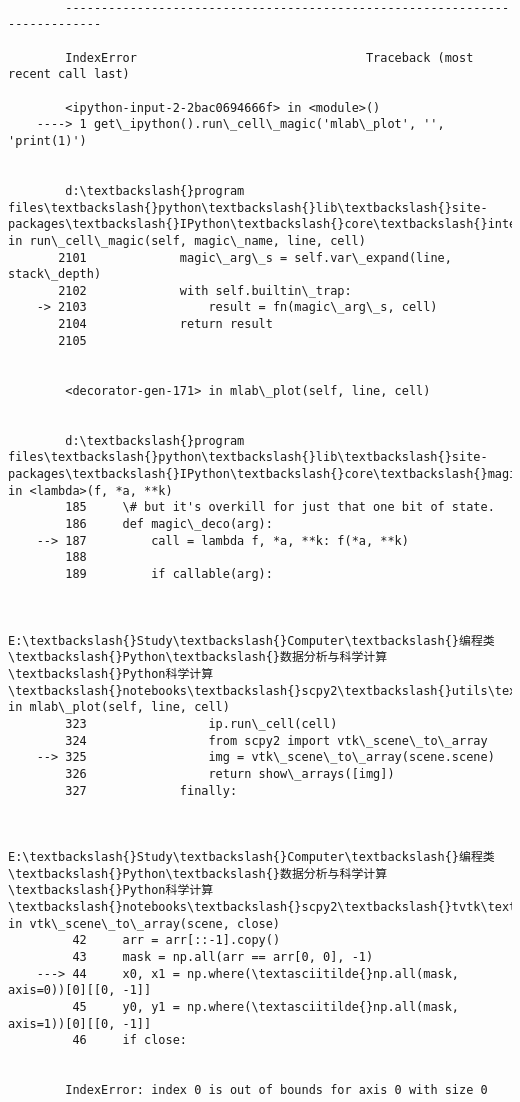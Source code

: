 \documentclass[11pt]{article}
\begin{document}
    \begin{Verbatim}[commandchars=\\\{\}]

        ---------------------------------------------------------------------------

        IndexError                                Traceback (most recent call last)

        <ipython-input-2-2bac0694666f> in <module>()
    ----> 1 get\_ipython().run\_cell\_magic('mlab\_plot', '', 'print(1)')
    

        d:\textbackslash{}program files\textbackslash{}python\textbackslash{}lib\textbackslash{}site-packages\textbackslash{}IPython\textbackslash{}core\textbackslash{}interactiveshell.py in run\_cell\_magic(self, magic\_name, line, cell)
       2101             magic\_arg\_s = self.var\_expand(line, stack\_depth)
       2102             with self.builtin\_trap:
    -> 2103                 result = fn(magic\_arg\_s, cell)
       2104             return result
       2105 


        <decorator-gen-171> in mlab\_plot(self, line, cell)


        d:\textbackslash{}program files\textbackslash{}python\textbackslash{}lib\textbackslash{}site-packages\textbackslash{}IPython\textbackslash{}core\textbackslash{}magic.py in <lambda>(f, *a, **k)
        185     \# but it's overkill for just that one bit of state.
        186     def magic\_deco(arg):
    --> 187         call = lambda f, *a, **k: f(*a, **k)
        188 
        189         if callable(arg):


        E:\textbackslash{}Study\textbackslash{}Computer\textbackslash{}编程类\textbackslash{}Python\textbackslash{}数据分析与科学计算\textbackslash{}Python科学计算\textbackslash{}notebooks\textbackslash{}scpy2\textbackslash{}utils\textbackslash{}nbmagics.py in mlab\_plot(self, line, cell)
        323                 ip.run\_cell(cell)
        324                 from scpy2 import vtk\_scene\_to\_array
    --> 325                 img = vtk\_scene\_to\_array(scene.scene)
        326                 return show\_arrays([img])
        327             finally:


        E:\textbackslash{}Study\textbackslash{}Computer\textbackslash{}编程类\textbackslash{}Python\textbackslash{}数据分析与科学计算\textbackslash{}Python科学计算\textbackslash{}notebooks\textbackslash{}scpy2\textbackslash{}tvtk\textbackslash{}tvtkhelp.py in vtk\_scene\_to\_array(scene, close)
         42     arr = arr[::-1].copy()
         43     mask = np.all(arr == arr[0, 0], -1)
    ---> 44     x0, x1 = np.where(\textasciitilde{}np.all(mask, axis=0))[0][[0, -1]]
         45     y0, y1 = np.where(\textasciitilde{}np.all(mask, axis=1))[0][[0, -1]]
         46     if close:


        IndexError: index 0 is out of bounds for axis 0 with size 0

    \end{Verbatim}
\end{document}
